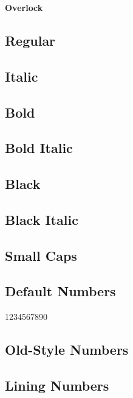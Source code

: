 \documentclass[12pt]{article}
\begin{document}
\begin{center}\Huge\bfseries
Overlock
\end{center}

\subsection*{Regular}
\lipsum[1]

\subsection*{Italic}
\textit{\lipsum[2]}

\subsection*{Bold}

\textbf{\lipsum[3]}

\subsection*{Bold Italic}

\textbf{\textit{\lipsum[4]}}


\subsection*{Black}

{\overlockBlack\lipsum[5]}

\subsection*{Black Italic}

{\overlockBlack\itshape\lipsum[6]}

\subsection*{Small Caps}
\textsc{\lipsum[7]}

\subsection*{Default Numbers}

1234567890

\subsection*{Old-Style Numbers}


\subsection*{Lining Numbers}

\end{document}
